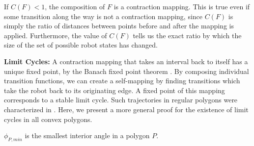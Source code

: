 \documentclass[]{styles/svproc}  %
\begin{document}
If $C(F) < 1$, the composition of $F$ is a contraction mapping. This is true even if some transition along
the way is not a
contraction mapping, since $C(F)$ is simply the ratio of distances
between points before and after the mapping is applied. Furthermore, the value
of $C(F)$ tells us the exact ratio by which the
size of the set of possible robot states has changed.

\textbf{Limit Cycles:} A contraction mapping that takes an interval back
to itself has a unique fixed point, by the Banach fixed point
theorem \cite{Granas2003}. By composing individual transition functions, 
we can create a self-mapping 
by finding transitions which take the robot back to its originating edge. A fixed
point of this mapping corresponds to a stable limit cycle.
Such trajectories in regular polygons were characterized in \cite{NilBecLav17}.
Here, we present a more general proof for the existence of limit cycles in all
convex polygons.

\begin{definition}
$\phi_{P,min}$ is the smallest interior angle in a polygon $P$.
\end{definition}
\end{document}
